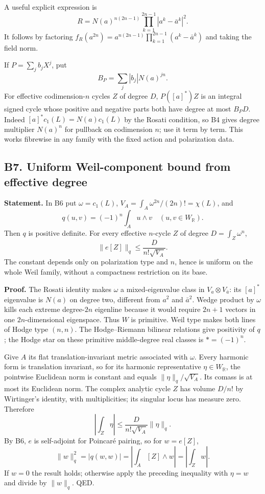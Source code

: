 \documentclass[11pt,a4paper]{article}
\theoremstyle{definition}
\begin{document}
A useful explicit expression is \[
 R=N(a)^{n(2n-1)}\prod_{k=1}^{2n-1}|a^k-\bar a^k|^2.
\] It follows by factoring \(f_R(a^{2n})=a^{n(2n-1)}\prod_{k=1}^{2n-1}(a^k-\bar a^k)\) and taking the field norm.

If \(P=\sum_jb_jX^j\), put \[
 B_P=\sum_j|b_j|N(a)^{jn}.
\] For effective codimension-\(n\) cycles \(Z\) of degree \(D\), \(P([a]^*)Z\) is an integral signed cycle whose positive and negative parts both have degree at most \(B_PD\). Indeed \([a]^*c_1(L)=N(a)c_1(L)\) by the Rosati condition, so B4 gives degree multiplier \(N(a)^n\) for pullback on codimension \(n\); use it term by term. This works fibrewise in any family with the fixed action and polarization data.

\subsection{B7. Uniform Weil-component bound from effective degree}\label{b7.-uniform-weil-component-bound-from-effective-degree}

\textbf{Statement.} In B6 put \(\omega=c_1(L)\), \(V_A=\int_A\omega^{2n}/(2n)!=\chi(L)\), and \[
 q(u,v)=(-1)^n\int_Au\wedge v\quad(u,v\in W_\mathbb R).
\] Then \(q\) is positive definite. For every effective \(n\)-cycle \(Z\) of degree \(D=\int_Z\omega^n\), \[
 \|e[Z]\|_q\leq\frac{D}{n!\sqrt{V_A}}.
\] The constant depends only on polarization type and \(n\), hence is uniform on the whole Weil family, without a compactness restriction on its base.

\textbf{Proof.} The Rosati identity makes \(\omega\) a mixed-eigenvalue class in \(V_a\otimes V_{\bar a}\): its \([a]^*\) eigenvalue is \(N(a)\) on degree two, different from \(a^2\) and \(\bar a^2\). Wedge product by \(\omega\) kills each extreme degree-\(2n\) eigenline because it would require \(2n+1\) vectors in one \(2n\)-dimensional eigenspace. Thus \(W\) is primitive. Weil type makes both lines of Hodge type \((n,n)\). The Hodge--Riemann bilinear relations give positivity of \(q\); the Hodge star on these primitive middle-degree real classes is \(*=(-1)^n\).

Give \(A\) its flat translation-invariant metric associated with \(\omega\). Every harmonic form is translation invariant, so for its harmonic representative \(\eta\in W_\mathbb R\), the pointwise Euclidean norm is constant and equals \(\|\eta\|_q/\sqrt{V_A}\). Its comass is at most its Euclidean norm. The complex analytic cycle \(Z\) has volume \(D/n!\) by Wirtinger's identity, with multiplicities; its singular locus has measure zero. Therefore \[
 \left|\int_Z\eta\right|\leq\frac{D}{n!\sqrt{V_A}}\|\eta\|_q.
\] By B6, \(e\) is self-adjoint for Poincaré pairing, so for \(w=e[Z]\), \[
 \|w\|_q^2=|q(w,w)|=\left|\int_A[Z]\wedge w\right|=\left|\int_Zw\right|.
\] If \(w=0\) the result holds; otherwise apply the preceding inequality with \(\eta=w\) and divide by \(\|w\|_q\). QED.
\end{document}

